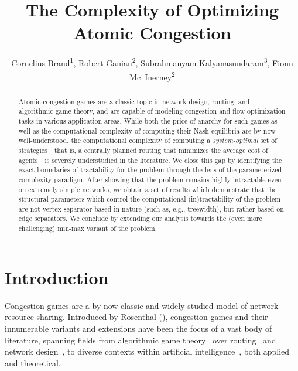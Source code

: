 \documentclass[letterpaper]{article} %
\title{The Complexity of Optimizing Atomic Congestion}
\author{Cornelius Brand\textsuperscript{\rm 1}, Robert Ganian\textsuperscript{\rm 2}, Subrahmanyam Kalyanasundaram\textsuperscript{\rm 3}, Fionn {Mc~Inerney}\textsuperscript{\rm 2}}
\begin{document}
\maketitle

\begin{abstract}
Atomic congestion games are a classic topic in network design, routing, and algorithmic game theory, and are capable of modeling congestion and flow optimization tasks in various application areas.
While both the price of anarchy for such games as well as the computational complexity of computing their Nash equilibria are by now well-understood,
the computational complexity of computing a \emph{system-optimal} set of strategies---that is, a centrally planned routing that minimizes the average cost of agents---is severely understudied in the literature.
We close this gap by identifying the exact boundaries of tractability for the problem through the lens of the parameterized complexity paradigm.
After showing that the problem remains highly intractable even on extremely simple networks, we obtain a set of results which demonstrate that the structural parameters which control the computational (in)tractability of the problem are not vertex-separator based in nature (such as, e.g., treewidth), but rather based on edge separators. We conclude by extending our analysis towards the (even more challenging) min-max variant of the problem.
\end{abstract}

\section{Introduction}
Congestion games are a by-now classic and widely studied model of network resource sharing.
Introduced by Rosenthal (\citeyear{Rosenthal73}), congestion games and their innumerable variants and extensions have been the focus of a vast body of literature, spanning fields from algorithmic game theory~\cite{CominettiS0M19} over routing~\cite{KunniyurS03} and network design~\cite{AnshelevichDKTWR04}, to diverse contexts within artificial intelligence~\cite{AshlagiMT07,MeirTBK12,MarchesiC019,HarksHKMS22}, both applied and theoretical.
\end{document}
